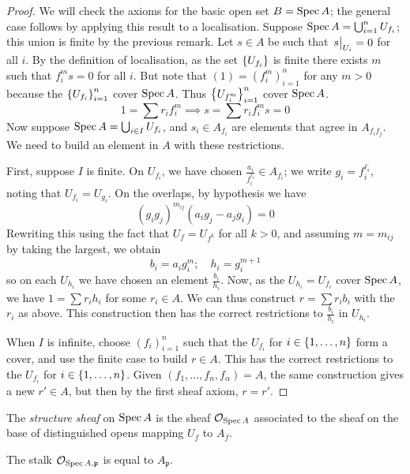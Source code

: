 \begin{proof}
    We will check the axioms for the basic open set \( B = \operatorname{Spec} A \); the general case follows by applying this result to a localisation.
    Suppose \( \operatorname{Spec} A = \bigcup_{i = 1}^n U_{f_i} \); this union is finite by the previous remark.
    Let \( s \in A \) be such that \( \eval{s}_{U_i} = 0 \) for all \( i \).
    By the definition of localisation, as the set \( \qty{U_{f_i}} \) is finite there exists \( m \) such that \( f_i^m s = 0 \) for all \( i \).
    But note that \( (1) = (f_i^m)_{i = 1}^n \) for any \( m > 0 \) because the \( \qty{U_{f_i}}_{i=1}^n \) cover \( \operatorname{Spec} A \).
    Thus \( \qty{U_{f_i^m}}_{i=1}^n \) cover \( \operatorname{Spec} A \).
    \[ 1 = \sum r_i f_i^m \implies s = \sum r_i f_i^m s = 0 \]
    Now suppose \( \operatorname{Spec} A = \bigcup_{i \in I} U_{f_i} \), and \( s_i \in A_{f_i} \) are elements that agree in \( A_{f_i f_j} \).
    We need to build an element in \( A \) with these restrictions.

    First, suppose \( I \) is finite.
    On \( U_{f_i} \), we have chosen \( \frac{a_i}{f_i^{\ell_i}} \in A_{f_i} \); we write \( g_i = f_i^{\ell_i} \), noting that \( U_{f_i} = U_{g_i} \).
    On the overlaps, by hypothesis we have
    \[ (g_i g_j)^{m_{ij}} (a_i g_j - a_j g_i) = 0 \]
    Rewriting this using the fact that \( U_f = U_{f^k} \) for all \( k > 0 \), and assuming \( m = m_{ij} \) by taking the largest, we obtain
    \[ b_i = a_i g_i^m;\quad h_i = g_i^{m+1} \]
    so on each \( U_{h_i} \) we have chosen an element \( \frac{b_i}{h_i} \).
    Now, as the \( U_{h_i} = U_{f_i} \) cover \( \operatorname{Spec} A \), we have \( 1 = \sum r_i h_i \) for some \( r_i \in A \).
    We can thus construct \( r = \sum r_i b_i \) with the \( r_i \) as above.
    This construction then has the correct restrictions to \( \frac{b_i}{h_i} \) in \( U_{h_i} \).

    When \( I \) is infinite, choose \( (f_i)_{i=1}^n \) such that the \( U_{f_i} \) for \( i \in \qty{1, \dots, n} \) form a cover, and use the finite case to build \( r \in A \).
    This has the correct restrictions to the \( U_{f_i} \) for \( i \in \qty{1, \dots, n} \).
    Given \( (f_1, \dots, f_n, f_\alpha) = A \), the same construction gives a new \( r' \in A \), but then by the first sheaf axiom, \( r = r' \).
\end{proof}
\begin{definition}
    The \emph{structure sheaf} on \( \operatorname{Spec} A \) is the sheaf \( \mathcal O_{\operatorname{Spec} A} \) associated to the sheaf on the base of distinguished opens mapping \( U_f \) to \( A_f \).
\end{definition}
\begin{remark}
    The stalk \( \mathcal O_{\operatorname{Spec} A, \mathfrak p} \) is equal to \( A_{\mathfrak p} \).
\end{remark}

